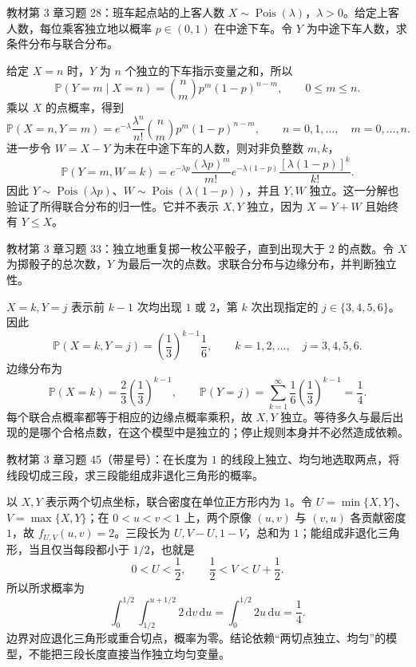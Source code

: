 \begin{example}
\label{ex:study-ch3-exercise-28}
教材第 3 章习题 28：班车起点站的上客人数 $X\sim\operatorname{Pois}(\lambda)$，$\lambda>0$。给定上客人数，每位乘客独立地以概率 $p\in(0,1)$ 在中途下车。令 $Y$ 为中途下车人数，求条件分布与联合分布。
\end{example}

\begin{solve}
给定 $X=n$ 时，$Y$ 为 $n$ 个独立的下车指示变量之和，所以
\[
  \mathbb P(Y=m\mid X=n)=\binom nm p^m(1-p)^{n-m},
  \qquad0\le m\le n.
\]
乘以 $X$ 的点概率，得到
\[
  \mathbb P(X=n,Y=m)
  =e^{-\lambda}\frac{\lambda^n}{n!}\binom nm p^m(1-p)^{n-m},
  \qquad n=0,1,\ldots,\quad m=0,\ldots,n.
\]
进一步令 $W=X-Y$ 为未在中途下车的人数，则对非负整数 $m,k$，
\[
  \mathbb P(Y=m,W=k)
  =e^{-\lambda p}\frac{(\lambda p)^m}{m!}
   e^{-\lambda(1-p)}\frac{[\lambda(1-p)]^k}{k!}.
\]
因此 $Y\sim\operatorname{Pois}(\lambda p)$、$W\sim\operatorname{Pois}(\lambda(1-p))$，并且 $Y,W$ 独立。这一分解也验证了所得联合分布的归一性。它并不表示 $X,Y$ 独立，因为 $X=Y+W$ 且始终有 $Y\le X$。
\end{solve}

\begin{example}
\label{ex:study-ch3-exercise-33}
教材第 3 章习题 33：独立地重复掷一枚公平骰子，直到出现大于 $2$ 的点数。令 $X$ 为掷骰子的总次数，$Y$ 为最后一次的点数。求联合分布与边缘分布，并判断独立性。
\end{example}

\begin{solve}
$X=k,Y=j$ 表示前 $k-1$ 次均出现 $1$ 或 $2$，第 $k$ 次出现指定的 $j\in\{3,4,5,6\}$。因此
\[
  \mathbb P(X=k,Y=j)=\left(\frac13\right)^{k-1}\frac16,
  \qquad k=1,2,\ldots,\quad j=3,4,5,6.
\]
边缘分布为
\[
  \mathbb P(X=k)=\frac23\left(\frac13\right)^{k-1},\qquad
  \mathbb P(Y=j)=\sum_{k=1}^\infty\frac16\left(\frac13\right)^{k-1}
               =\frac14.
\]
每个联合点概率都等于相应的边缘点概率乘积，故 $X,Y$ 独立。等待多久与最后出现的是哪个合格点数，在这个模型中是独立的；停止规则本身并不必然造成依赖。
\end{solve}

\begin{example}
\label{ex:study-ch3-exercise-45}
教材第 3 章习题 45（带星号）：在长度为 $1$ 的线段上独立、均匀地选取两点，将线段切成三段，求三段能组成非退化三角形的概率。
\end{example}

\begin{solve}
以 $X,Y$ 表示两个切点坐标，联合密度在单位正方形内为 $1$。令 $U=\min\{X,Y\}$、$V=\max\{X,Y\}$；在 $0<u<v<1$ 上，两个原像 $(u,v)$ 与 $(v,u)$ 各贡献密度 $1$，故 $f_{U,V}(u,v)=2$。三段长为 $U,V-U,1-V$，总和为 $1$；能组成非退化三角形，当且仅当每段都小于 $1/2$，也就是
\[
  0<U<\frac12,\qquad \frac12<V<U+\frac12.
\]
所以所求概率为
\[
  \int_0^{1/2}\int_{1/2}^{u+1/2}2\,\mathrm dv\,\mathrm du
  =\int_0^{1/2}2u\,\mathrm du=\frac14.
\]
边界对应退化三角形或重合切点，概率为零。结论依赖“两切点独立、均匀”的模型，不能把三段长度直接当作独立均匀变量。
\end{solve}





